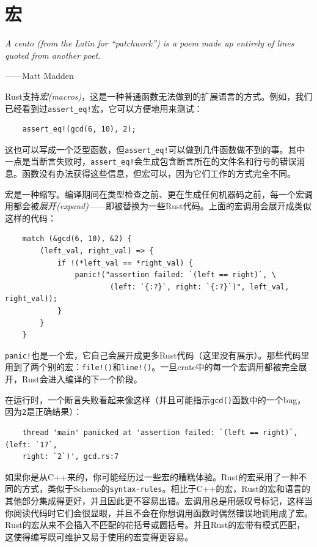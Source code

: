 \chapter{宏}\label{ch21}

\emph{A cento (from the Latin for “patchwork”) is a poem made up entirely of lines quoted from another poet.}
\begin{flushright}
    ——Matt Madden
\end{flushright}

Rust支持\emph{宏(macros)}，这是一种普通函数无法做到的扩展语言的方式。例如，我们已经看到过\texttt{assert\_eq!}宏，它可以方便地用来测试：
\begin{verbatim}
    assert_eq!(gcd(6, 10), 2);
\end{verbatim}

这也可以写成一个泛型函数，但\texttt{assert\_eq!}可以做到几件函数做不到的事。其中一点是当断言失败时，\texttt{assert\_eq!}会生成包含断言所在的文件名和行号的错误消息。函数没有办法获得这些信息，但宏可以，因为它们工作的方式完全不同。

宏是一种缩写。编译期间在类型检查之前、更在生成任何机器码之前，每一个宏调用都会被\emph{展开(expand)}——即被替换为一些Rust代码。上面的宏调用会展开成类似这样的代码：
\begin{verbatim}
    match (&gcd(6, 10), &2) {
        (left_val, right_val) => {
            if !(*left_val == *right_val) {
                panic!("assertion failed: `(left == right)`, \
                        (left: `{:?}`, right: `{:?}`)", left_val, right_val));
            }
        }
    }
\end{verbatim}

\texttt{panic!}也是一个宏，它自己会展开成更多Rust代码（这里没有展示）。那些代码里用到了两个别的宏：\texttt{file!()}和\texttt{line!()}。一旦crate中的每一个宏调用都被完全展开，Rust会进入编译的下一个阶段。

在运行时，一个断言失败看起来像这样（并且可能指示\texttt{gcd()}函数中的一个bug，因为\texttt{2}是正确结果）：
\begin{verbatim}
    thread 'main' panicked at 'assertion failed: `(left == right)`, (left: `17`,
    right: `2`)', gcd.rs:7
\end{verbatim}

如果你是从C++来的，你可能经历过一些宏的糟糕体验。Rust的宏采用了一种不同的方式，类似于Scheme的\texttt{syntax-rules}。相比于C++的宏，Rust的宏和语言的其他部分集成得更好，并且因此更不容易出错。宏调用总是用感叹号标记，这样当你阅读代码时它们会很显眼，并且不会在你想调用函数时偶然错误地调用成了宏。Rust的宏从来不会插入不匹配的花括号或圆括号。并且Rust的宏带有模式匹配，这使得编写既可维护又易于使用的宏变得更容易。


